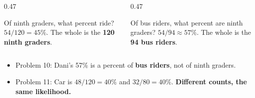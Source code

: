 \documentclass[aspectratio=169, 11pt]{beamer}
\newcommand{\redink}[1]{{\color{redacc}\bfseries #1}}
\begin{document}
\begin{frame}[t, plain]
  \vspace{4pt}
  \begin{columns}[t]
    \begin{column}{0.47\textwidth}
      \begin{block}{Of ninth graders, what percent ride?}
        $54/120 = 45\%$. The whole is the \textbf{120 ninth graders}.
      \end{block}
    \end{column}
    \begin{column}{0.47\textwidth}
      \begin{block}{Of bus riders, what percent are ninth graders?}
        $54/94 \approx 57\%$. The whole is the \textbf{94 bus riders}.
      \end{block}
    \end{column}
  \end{columns}
  \vspace{8pt}
  \begin{itemize}\setlength{\itemsep}{4pt}
    \item Problem 10: Dani's 57\% is a percent of \redink{bus riders}, not of ninth graders.
    \item Problem 11: Car is $48/120 = 40\%$ and $32/80 = 40\%$. \textbf{Different counts, the
          same likelihood.}
  \end{itemize}
\end{frame}
\end{document}
